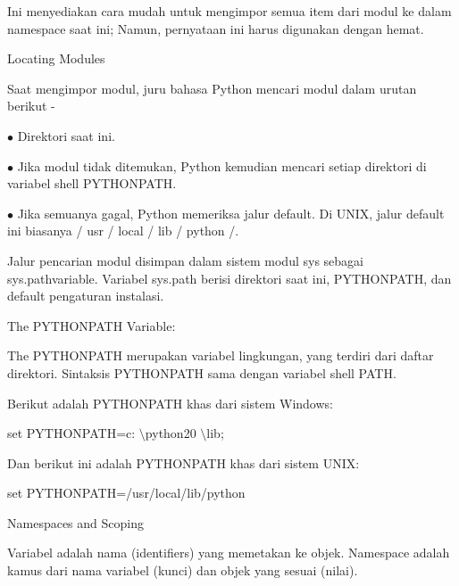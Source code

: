 \noindent 
Ini menyediakan cara mudah untuk mengimpor semua item dari modul ke dalam namespace saat ini; Namun, pernyataan ini harus digunakan dengan hemat. \par
\vspace{12pt}
\noindent 
Locating Modules \par
\noindent 
Saat mengimpor modul, juru bahasa Python mencari modul dalam urutan berikut - \par
\noindent 
 \hspace*{0.5in}  $ \bullet $ Direktori saat ini. \par
\noindent 
 \hspace*{0.5in}  $ \bullet $ Jika modul tidak ditemukan, Python kemudian mencari setiap direktori di variabel shell  \hspace*{0.5in} PYTHONPATH. \par
\noindent 
 \hspace*{0.5in}  $ \bullet $ Jika semuanya gagal, Python memeriksa jalur default. Di UNIX, jalur default ini  \hspace*{0.5in} biasanya / usr / local / lib / python /. \par
\vspace{12pt}
\noindent 
Jalur pencarian modul disimpan dalam sistem modul sys sebagai sys.pathvariable. Variabel sys.path berisi direktori saat ini, PYTHONPATH, dan default pengaturan instalasi. \par
\vspace{12pt}
\noindent 
The $  $PYTHONPATH $  $Variable: \par
\noindent 
The PYTHONPATH merupakan variabel lingkungan, yang terdiri dari daftar direktori. Sintaksis PYTHONPATH sama dengan variabel shell PATH. \par
\noindent 
Berikut adalah PYTHONPATH khas dari sistem Windows: \par
\noindent 
 \hspace*{0.5in} set PYTHONPATH=c: $  \setminus  $python20 $  \setminus  $lib; \par
\noindent 
Dan berikut ini adalah PYTHONPATH khas dari sistem UNIX: \par
\noindent 
 \hspace*{0.5in} set PYTHONPATH=/usr/local/lib/python \par
\vspace{12pt}
\noindent 
Namespaces and Scoping \par
\noindent 
Variabel adalah nama (identifiers) yang memetakan ke objek. Namespace adalah kamus dari nama variabel (kunci) dan objek yang sesuai (nilai). \par
